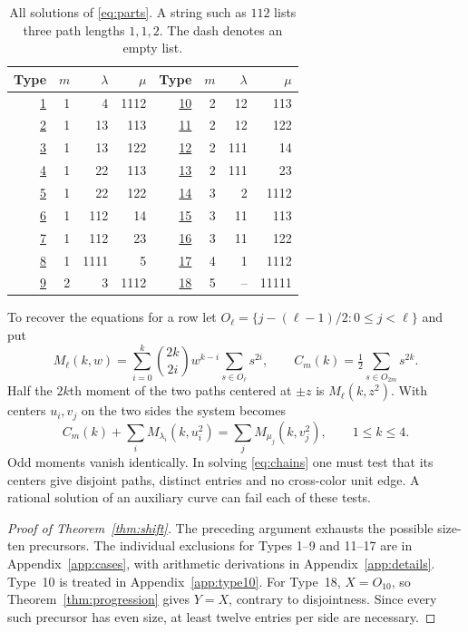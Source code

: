 \begin{table}[htbp]\centering\small
\caption{All solutions of \eqref{eq:parts}. A string such as \(112\) lists three path lengths \(1,1,2\). The dash denotes an empty list.}\label{tab:parts}
\begin{tabular}{rrrr@{\hspace{3em}}rrrr}
\toprule Type&\(m\)&\(\lambda\)&\(\mu\)&Type&\(m\)&\(\lambda\)&\(\mu\)\\\midrule
\hyperref[app:type1]{1}&1&4&1112&\hyperref[app:type10]{10}&2&12&113\\
\hyperref[app:type2]{2}&1&13&113&\hyperref[app:type11]{11}&2&12&122\\
\hyperref[app:type3]{3}&1&13&122&\hyperref[app:type12]{12}&2&111&14\\
\hyperref[app:type4]{4}&1&22&113&\hyperref[app:type13]{13}&2&111&23\\
\hyperref[app:type5]{5}&1&22&122&\hyperref[app:type14]{14}&3&2&1112\\
\hyperref[app:type6]{6}&1&112&14&\hyperref[app:type15]{15}&3&11&113\\
\hyperref[app:type7]{7}&1&112&23&\hyperref[app:type16]{16}&3&11&122\\
\hyperref[app:type8]{8}&1&1111&5&\hyperref[app:type17]{17}&4&1&1112\\
\hyperref[app:type9]{9}&2&3&1112&\hyperref[sec:marked]{18}&5&--&11111\\\bottomrule
\end{tabular}
\end{table}

To recover the equations for a row let \(O_\ell=\{j-(\ell-1)/2:0\le j<\ell\}\) and put
\[
 M_\ell(k,w)=\sum_{i=0}^k\binom{2k}{2i}w^{k-i}\sum_{s\in O_\ell}s^{2i},
 \qquad C_m(k)=\tfrac12\sum_{s\in O_{2m}}s^{2k}.
\]
Half the \(2k\)th moment of the two paths centered at \(\pm z\) is \(M_\ell(k,z^2)\). With centers \(u_i,v_j\) on the two sides the system becomes
\begin{equation}\label{eq:chains}
 C_m(k)+\sum_i M_{\lambda_i}(k,u_i^2)=
 \sum_j M_{\mu_j}(k,v_j^2),\qquad 1\le k\le4 .
\end{equation}
Odd moments vanish identically. In solving \eqref{eq:chains} one must test that its centers give disjoint paths, distinct entries and no cross-color unit edge. A rational solution of an auxiliary curve can fail each of these tests.

\begin{proof}[Proof of Theorem~\ref{thm:shift}]
The preceding argument exhausts the possible size-ten precursors. The individual exclusions for Types 1--9 and 11--17 are in Appendix~\ref{app:cases}, with arithmetic derivations in Appendix~\ref{app:details}. Type~10 is treated in Appendix~\ref{app:type10}. For Type~18, \(X=O_{10}\), so Theorem~\ref{thm:progression} gives \(Y=X\), contrary to disjointness. Since every such precursor has even size, at least twelve entries per side are necessary.
\end{proof}
